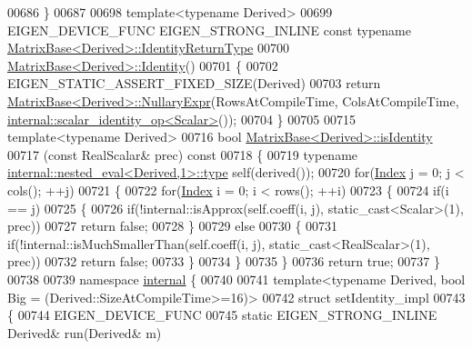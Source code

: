 \begin{DoxyCode}
00686 \}
00687 
00698 \textcolor{keyword}{template}<\textcolor{keyword}{typename} Derived>
00699 EIGEN\_DEVICE\_FUNC EIGEN\_STRONG\_INLINE \textcolor{keyword}{const} \textcolor{keyword}{typename} 
      \hyperlink{group___core___module_class_eigen_1_1_cwise_nullary_op}{MatrixBase<Derived>::IdentityReturnType}
00700 \hyperlink{group___core___module_a2ef43190f3aba0aef0cf1030d46d0ca7}{MatrixBase<Derived>::Identity}()
00701 \{
00702   EIGEN\_STATIC\_ASSERT\_FIXED\_SIZE(Derived)
00703   \textcolor{keywordflow}{return} \hyperlink{group___core___module_class_eigen_1_1_matrix_base}{MatrixBase<Derived>::NullaryExpr}(RowsAtCompileTime, 
      ColsAtCompileTime, \hyperlink{struct_eigen_1_1internal_1_1scalar__identity__op}{internal::scalar\_identity\_op<Scalar>}());
00704 \}
00705 
00715 \textcolor{keyword}{template}<\textcolor{keyword}{typename} Derived>
00716 \textcolor{keywordtype}{bool} \hyperlink{group___core___module_a4ccbd8dfa06e9d47b9bf84711f8b9d40}{MatrixBase<Derived>::isIdentity}
00717 (\textcolor{keyword}{const} RealScalar& prec)\textcolor{keyword}{ const}
00718 \textcolor{keyword}{}\{
00719   \textcolor{keyword}{typename} \hyperlink{class_eigen_1_1internal_1_1_tensor_lazy_evaluator_writable}{internal::nested\_eval<Derived,1>::type} \textcolor{keyword}{self}(derived());
00720   \textcolor{keywordflow}{for}(\hyperlink{namespace_eigen_a62e77e0933482dafde8fe197d9a2cfde}{Index} j = 0; j < cols(); ++j)
00721   \{
00722     \textcolor{keywordflow}{for}(\hyperlink{namespace_eigen_a62e77e0933482dafde8fe197d9a2cfde}{Index} i = 0; i < rows(); ++i)
00723     \{
00724       \textcolor{keywordflow}{if}(i == j)
00725       \{
00726         \textcolor{keywordflow}{if}(!internal::isApprox(\textcolor{keyword}{self}.coeff(i, j), static\_cast<Scalar>(1), prec))
00727           \textcolor{keywordflow}{return} \textcolor{keyword}{false};
00728       \}
00729       \textcolor{keywordflow}{else}
00730       \{
00731         \textcolor{keywordflow}{if}(!internal::isMuchSmallerThan(\textcolor{keyword}{self}.coeff(i, j), static\_cast<RealScalar>(1), prec))
00732           \textcolor{keywordflow}{return} \textcolor{keyword}{false};
00733       \}
00734     \}
00735   \}
00736   \textcolor{keywordflow}{return} \textcolor{keyword}{true};
00737 \}
00738 
00739 \textcolor{keyword}{namespace }\hyperlink{namespaceinternal}{internal} \{
00740 
00741 \textcolor{keyword}{template}<\textcolor{keyword}{typename} Derived, \textcolor{keywordtype}{bool} Big = (Derived::SizeAtCompileTime>=16)>
00742 \textcolor{keyword}{struct} setIdentity\_impl
00743 \{
00744   EIGEN\_DEVICE\_FUNC
00745   \textcolor{keyword}{static} EIGEN\_STRONG\_INLINE Derived& run(Derived& m)

\end{DoxyCode}
